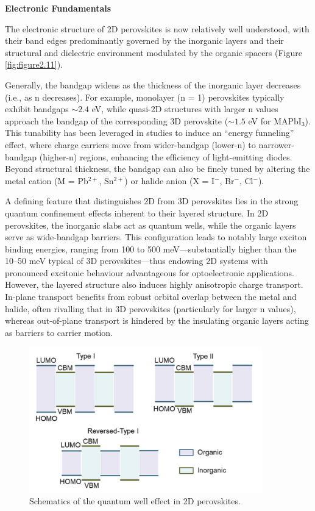 \textbf{Electronic Fundamentals}

The electronic structure of 2D perovskites is now relatively well understood, with their band edges predominantly governed by the inorganic layers and their structural and dielectric environment modulated by the organic spacers (Figure \ref{fig:figure2.11}). 

Generally, the bandgap widens as the thickness of the inorganic layer decreases (i.e., as n decreases). For example, monolayer (n = 1) perovskites typically exhibit bandgaps $\sim2.4$ eV, while quasi-2D structures with larger n values approach the bandgap of the corresponding 3D perovskite ($\sim1.5$ eV for MAPbI$_3$)\cite{RN199}. This tunability has been leveraged in studies to induce an “energy funneling” effect, where charge carriers move from wider-bandgap (lower-n) to narrower-bandgap (higher-n) regions, enhancing the efficiency of light-emitting diodes\cite{RN180}. Beyond structural thickness, the bandgap can also be finely tuned by altering the metal cation (M = Pb$^{2+}$, Sn$^{2+}$) or halide anion (X = I$^-$, Br$^-$, Cl$^-$)\cite{RN104}.



A defining feature that distinguishes 2D from 3D perovskites lies in the strong quantum confinement effects inherent to their layered structure\cite{RN385}. In 2D perovskites, the inorganic slabs act as quantum wells, while the organic layers serve as wide-bandgap barriers\cite{RN394}. This configuration leads to notably large exciton binding energies, ranging from 100 to 500 meV—substantially higher than the 10–50 meV typical of 3D perovskites—thus endowing 2D systems with pronounced excitonic behaviour advantageous for optoelectronic applications. However, the layered structure also induces highly anisotropic charge transport. In-plane transport benefits from robust orbital overlap between the metal and halide, often rivalling that in 3D perovskites (particularly for larger n values), whereas out-of-plane transport is hindered by the insulating organic layers acting as barriers to carrier motion\cite{RN119}.

\begin{figure}[ht]
    \centering
    \includegraphics[width=0.9\textwidth]{figures/literature-review/figure2-12.png}
    \caption{Schematics of the quantum well effect in 2D perovskites\cite{RN304}.}
    \label{fig:figure2.12}
\end{figure}

